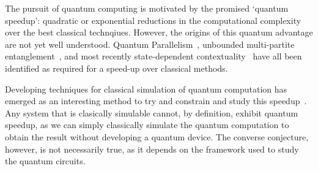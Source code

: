\documentclass{standalone}
\begin{document}
The pursuit of quantum computing is motivated by the promised `quantum speedup': quadratic or exponential reductions in the computational complexity over the best classical technqiues. However, the origins of this quantum advantage are not yet well understood. Quantum Parallelism~\cite{Deutsch1985}, unbounded multi-partite entanglement~\cite{Jozsa2003}, and most recently state-dependent contextuality~\cite{Howard2014} have all been identified as required for a speed-up over classical methods. 
\par
Developing techniques for classical simulation of quantum computation has emerged as an interesting method to try and constrain and study this speedup~\cite{Jozsa2003}. Any system that is clasically simulable cannot, by definition, exhibit quantum speedup, as we can simply classically simulate the quantum computation to obtain the result without developing a quantum device. The converse conjecture, however, is not necessarily true, as it depends on the framework used to study the quantum circuits.  
\par

\ifstandalone

\fi
\end{document}
